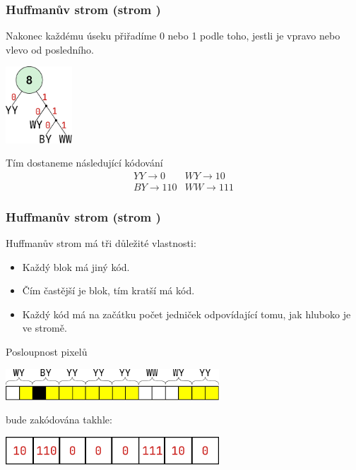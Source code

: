 \documentclass[aspectratio=169,11pt,svgnames]{beamer}
\begin{document}
\begin{frame}
 \frametitle{Huffmanův strom (strom )}
 Nakonec každému úseku přiřadíme 0 nebo 1 podle toho, jestli je vpravo nebo
 vlevo od posledního.
 \begin{center}
  \vspace*{-1em}
  \includegraphics[width=2.5cm]{tree-5.pdf}
  \vspace*{-.5em}
 \end{center}
 \pause
 Tím dostaneme následující kódování
 \[
  \begin{array}{cc}
   YY \to 0 & WY \to 10\\
   BY \to 110 & WW \to 111
  \end{array}
 \]
\end{frame}

\begin{frame}
 \frametitle{Huffmanův strom (strom )}
 Huffmanův strom má tři důležité vlastnosti:
 \begin{itemize}[label=\textbullet]
  \item Každý blok má jiný kód.
  \item Čím častější je blok, tím kratší má kód.
  \item Každý kód má na začátku počet jedniček odpovídající tomu, jak hluboko je
   ve stromě.
 \end{itemize}
 \pause
 Posloupnost pixelů
 \begin{center}
  \vspace*{-.5em}
  \includegraphics[width=8cm]{image-7.pdf}
  \vspace*{-.5em}
 \end{center}
 \pause
 bude zakódována takhle:
 \begin{center}
  \includegraphics[width=8cm]{tree-6.pdf}
  \vspace*{-.5em}
 \end{center}
\end{frame}
\end{document}
